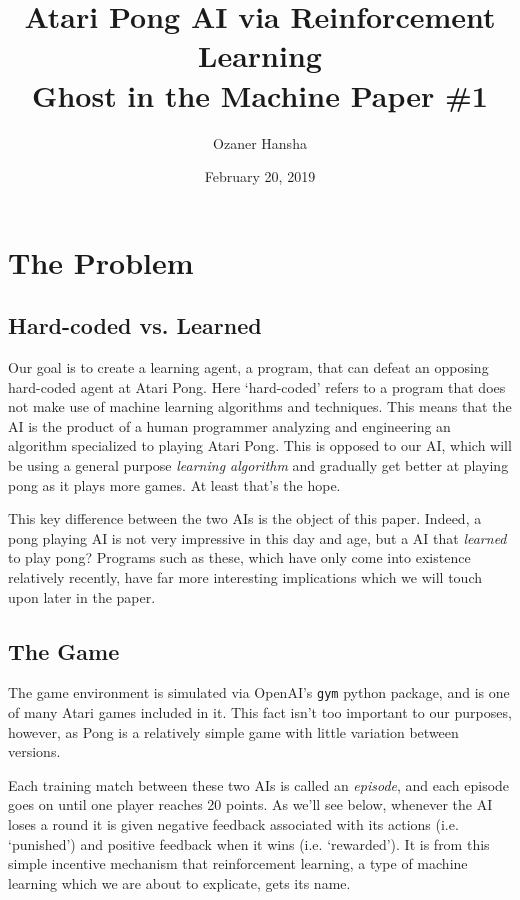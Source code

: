 \documentclass{article}
\begin{document}
\title{%
  Atari Pong AI via Reinforcement Learning \\
  \large Ghost in the Machine Paper \#1}
\author{Ozaner Hansha}
\date{February 20, 2019}
\maketitle


\section{The Problem}
\subsection{Hard-coded vs. Learned}
Our goal is to create a learning agent, a program, that can defeat an opposing hard-coded agent at Atari Pong. Here `hard-coded' refers to a program that does not make use of machine learning algorithms and techniques. This means that the AI is the product of a human programmer analyzing and engineering an algorithm specialized to playing Atari Pong. This is opposed to our AI, which will be using a general purpose \textit{learning algorithm} and gradually get better at playing pong as it plays more games. At least that's the hope.

This key difference between the two AIs is the object of this paper. Indeed, a pong playing AI is not very impressive in this day and age, but a AI that \textit{learned} to play pong? Programs such as these, which have only come into existence relatively recently, have far more interesting implications which we will touch upon later in the paper.
\subsection{The Game}
The game environment is simulated via OpenAI's \texttt{gym} python package, and is one of many Atari games included in it. This fact isn't too important to our purposes, however, as Pong is a relatively simple game with little variation between versions.

Each training match between these two AIs is called an \textit{episode}, and each episode goes on until one player reaches 20 points. As we'll see below, whenever the AI loses a round it is given negative feedback associated with its actions (i.e. `punished') and positive feedback when it wins (i.e. `rewarded'). It is from this simple incentive mechanism that reinforcement learning, a type of machine learning which we are about to explicate, gets its name.
\end{document}
